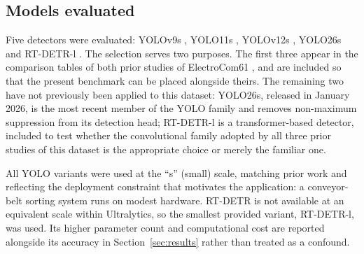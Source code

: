 %

\subsection{Models evaluated}
\label{sec:models-evaluated}

Five detectors were evaluated: YOLOv9s \citep{yolov9}, YOLO11s \citep{yolo11},
YOLOv12s \citep{yolov12}, YOLO26s \citep{yolo26} and RT-DETR-l
\citep{rtdetr}. The selection serves two purposes. The first three appear in the
comparison tables of both prior studies of ElectroCom61
\citep{yolov12paper,yolov13paper}, and are included so that the present
benchmark can be placed alongside theirs. The remaining two have not previously
been applied to this dataset: YOLO26s, released in January 2026, is the most
recent member of the YOLO family and removes non-maximum suppression from its
detection head; RT-DETR-l is a transformer-based detector, included to test
whether the convolutional family adopted by all three prior studies of this
dataset is the appropriate choice or merely the familiar one.

All YOLO variants were used at the ``s'' (small) scale, matching prior work and
reflecting the deployment constraint that motivates the application: a
conveyor-belt sorting system runs on modest hardware. RT-DETR is not available
at an equivalent scale within Ultralytics, so the smallest provided variant,
RT-DETR-l, was used. Its higher parameter count and computational cost are
reported alongside its accuracy in Section~\ref{sec:results} rather than treated
as a confound.

